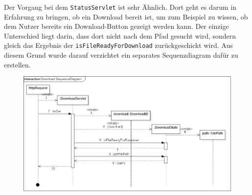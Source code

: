 Der Vorgang bei dem \texttt{StatusServlet} ist sehr Ähnlich. Dort geht es darum in Erfahrung zu bringen, ob ein Download bereit ist, um zum Beispiel zu wissen, ob dem Nutzer bereits ein Download-Button gezeigt werden kann. Der einzige Unterschied liegt darin, dass dort nicht nach dem Pfad gesucht wird, sondern gleich das Ergebnis der \texttt{isFileReadyForDownload} zurückgeschickt wird. Aus diesem Grund wurde darauf verzichtet ein separates Sequenzdiagram dafür zu erstellen.
\begin{figure}[!hbp]
	\centering
	\includegraphics[width=\linewidth]{images/export/DownloadSequenceDiagram.png}
\end{figure}
